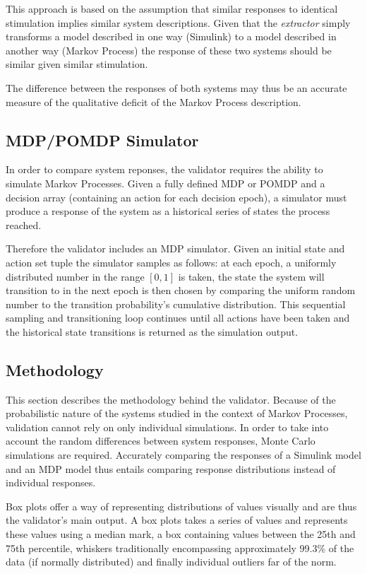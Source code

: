 This approach is based on the assumption that similar responses to identical stimulation implies similar system descriptions. Given that the \textit{extractor} simply transforms a model described in one way (Simulink) to a model described in another way (Markov Process) the response of these two systems should be similar given similar stimulation.

The difference between the responses of both systems may thus be an accurate measure of the qualitative deficit of the Markov Process description.

\subsection{MDP/POMDP Simulator}

In order to compare system reponses, the validator requires the ability to simulate Markov Processes. Given a fully defined MDP or POMDP and a decision array (containing an action for each decision epoch), a simulator must produce a response of the system as a historical series of states the process reached.

Therefore the validator includes an MDP simulator. Given an initial state and action set tuple the simulator samples as follows: at each epoch, a uniformly distributed number in the range $[0,1]$ is taken, the state the system will transition to in the next epoch is then chosen by comparing the uniform random number to the transition probability's cumulative distribution. This sequential sampling and transitioning loop continues until all actions have been taken and the historical state transitions is returned as the simulation output.

\subsection{Methodology}
\label{subsec:validationmethodology}

This section describes the methodology behind the validator. Because of the probabilistic nature of the systems studied in the context of Markov Processes, validation cannot rely on only individual simulations. In order to take into account the random differences between system responses, Monte Carlo simulations are required. Accurately comparing the responses of a Simulink model and an MDP model thus entails comparing response distributions instead of individual responses.

Box plots offer a way of representing distributions of values visually and are thus the validator's main output. A box plots takes a series of values and represents these values using a median mark, a box containing values between the 25th and 75th percentile, whiskers traditionally encompassing approximately 99.3\% of the data (if normally distributed) and finally individual outliers far of the norm.

